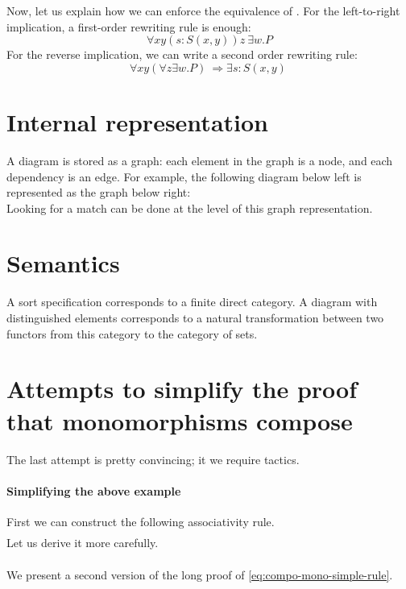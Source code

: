 \documentclass{article}
\begin{document}
Now, let us explain how we can enforce the equivalence of
.
For the left-to-right implication, a first-order rewriting rule is enough:
\[
    ∀ xy (s:S(x,y))z   \ 
    ∃ w. P
\]
For the reverse implication, we can write a second order rewriting rule:
\[
    ∀xy(∀ z ∃ w. P)\   ⇒ ∃s:S(x,y)  \
\]

\section{Internal representation}
A diagram is stored as a graph: 
each element in the graph is a node, and each dependency is an edge.
For example, the following diagram below left is represented as the graph below right:
\[

\]
Looking for a match can be done at the level of this graph representation.
\section{Semantics}
A sort specification corresponds to a finite direct category. 
A diagram with distinguished elements corresponds to a 
natural transformation between two functors from this category to the category of sets.
\appendix
\section{Attempts to simplify the proof that monomorphisms compose}
The last attempt is pretty convincing; it we require tactics.
\label{app:simplified-proof}
\paragraph{Simplifying the above example}
First we can construct the following associativity rule.
\begin{align}
    
    \tag{Comp-Assoc}
    \label{eq:comp-assoc}
\end{align}
Let us derive it more carefully.
\begin{align*}
    
\end{align*}

We present a second version of the long proof of \eqref{eq:compo-mono-simple-rule}.
\pagebreak
\[

\]
\end{document}
